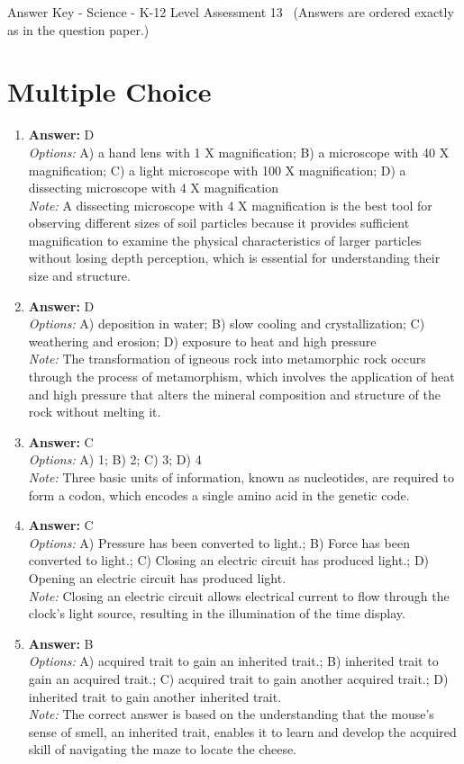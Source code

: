 \documentclass[12pt]{article}
\begin{document}
\begin{center}
Answer Key - Science - K-12 Level Assessment 13 \
\small (Answers are ordered exactly as in the question paper.)
\end{center}

\section*{Multiple Choice}
\begin{enumerate}[label=\arabic*.]
\item \textbf{Answer:} D
\\ \textit{Options:} A) a hand lens with 1 X magnification; B) a microscope with 40 X magnification; C) a light microscope with 100 X magnification; D) a dissecting microscope with 4 X magnification
\\ \textit{Note:} A dissecting microscope with 4 X magnification is the best tool for observing different sizes of soil particles because it provides sufficient magnification to examine the physical characteristics of larger particles without losing depth perception, which is essential for understanding their size and structure.
\item \textbf{Answer:} D
\\ \textit{Options:} A) deposition in water; B) slow cooling and crystallization; C) weathering and erosion; D) exposure to heat and high pressure
\\ \textit{Note:} The transformation of igneous rock into metamorphic rock occurs through the process of metamorphism, which involves the application of heat and high pressure that alters the mineral composition and structure of the rock without melting it.
\item \textbf{Answer:} C
\\ \textit{Options:} A) 1; B) 2; C) 3; D) 4
\\ \textit{Note:} Three basic units of information, known as nucleotides, are required to form a codon, which encodes a single amino acid in the genetic code.
\item \textbf{Answer:} C
\\ \textit{Options:} A) Pressure has been converted to light.; B) Force has been converted to light.; C) Closing an electric circuit has produced light.; D) Opening an electric circuit has produced light.
\\ \textit{Note:} Closing an electric circuit allows electrical current to flow through the clock's light source, resulting in the illumination of the time display.
\item \textbf{Answer:} B
\\ \textit{Options:} A) acquired trait to gain an inherited trait.; B) inherited trait to gain an acquired trait.; C) acquired trait to gain another acquired trait.; D) inherited trait to gain another inherited trait.
\\ \textit{Note:} The correct answer is based on the understanding that the mouse's sense of smell, an inherited trait, enables it to learn and develop the acquired skill of navigating the maze to locate the cheese.
\end{enumerate}
\end{document}
